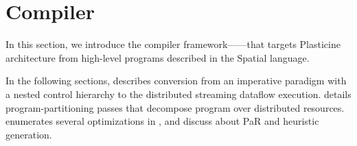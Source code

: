 \chapter{Compiler} \label{sec:compiler}

In this section, we introduce the compiler framework---\name---that targets Plasticine
architecture from high-level programs described in the Spatial language. 

In the following sections,  describes conversion from an imperative paradigm with
a nested control hierarchy to the distributed streaming dataflow execution.
 details program-partitioning passes that decompose program over distributed resources.
 enumerates several optimizations in \name, and  discuss about PaR and
heuristic generation.









